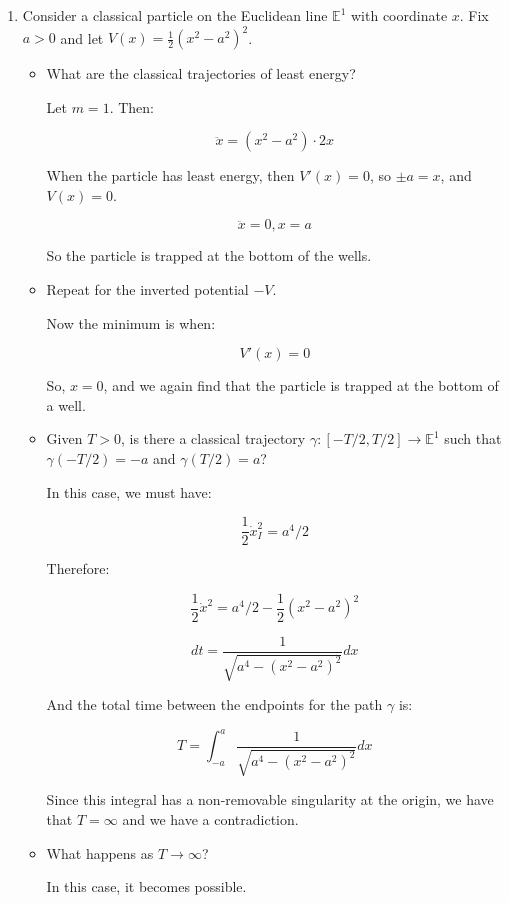 \begin{enumerate}
    \item Consider a classical particle on the Euclidean line $\mathbb{E}^1$ with coordinate $x$. Fix $a > 0$ and let $V(x) = \frac{1}{2}(x^2 - a^2)^2$.
    \begin{itemize}
        \item What are the classical trajectories of least energy?


        Let $m = 1$. Then:

        $$\ddot{x} = (x^2 - a^2) \cdot 2x$$

        When the particle has least energy, then $V'(x) = 0$, so $\pm a = x$, and $V(x) = 0$. 

        $$\ddot{x} = 0, x = a$$

        So the particle is trapped at the bottom of the wells. 

        \item Repeat for the inverted potential $-V$.

        Now the minimum is when:

        $$V'(x) = 0$$

        So, $x = 0$, and we again find that the particle is trapped at the bottom of a well. 
        

        \item Given $T > 0$, is there a classical trajectory $\gamma : [-T/2, T/2] \to \mathbb{E}^1$ such that $\gamma(-T/2) = -a$ and $\gamma(T/2) = a$?

        In this case, we must have:

        $$\frac{1}{2} \dot{x}_{I}^2 = a^4/2$$

        Therefore:

        $$\frac{1}{2} \dot{x}^2 = a^4/2 - \frac{1}{2}(x^2 - a^2)^2$$

        $$dt = \frac{1}{\sqrt{a^4 - (x^2 - a^2)^2}} dx$$

        And the total time between the endpoints for the path $\gamma$ is:

        $$T = \int_{-a}^{a} \frac{1}{\sqrt{a^4 - (x^2 - a^2)^2}} dx$$

        Since this integral has a non-removable singularity at the origin, we have that $T = \infty$ and we have a contradiction. 
        
        \item What happens as $T \to \infty$?

        In this case, it becomes possible. 
    \end{itemize}


\end{enumerate}
